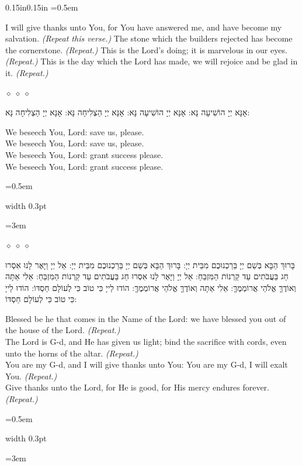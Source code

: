 \documentclass[11pt, openany]{book}
\newenvironment{englishblock}{%
  \par\vspace{2pt}
  \begin{adjustwidth}{0.15in}{0.15in}
  \setstretch{1.4}
  \emergencystretch=0.5em
  \normalsize
}{%
  \end{adjustwidth}
  \par\vspace{3pt}
}
\newcommand{\sederdivider}{%
  \par\vspace{6pt}
  \begin{center}
    \textcolor{sedergold}{\pgfornament[width=1.5cm]{11}}
  \end{center}
  \par\vspace{6pt}
}
\newlength{\bidiHebWidth}
\newlength{\bidiEngWidth}
\newenvironment{bilingual}{%
  \par\vspace{4pt}%
}{%
  \noindent
  \begin{minipage}[t]{\bidiEngWidth}
    \setstretch{1.4}\emergencystretch=0.5em\normalsize
    \usebox{\bidiEngBox}
  \end{minipage}%
  \hfill
  {\color{sedergold}\vrule width 0.3pt}%
  \hfill
  \begin{minipage}[t]{\bidiHebWidth}
    \begingroup\hebrewfont\TeXXeTstate=1\beginR
    \large\setstretch{1.4}\emergencystretch=3em\tolerance=9999\parindent=0pt\relax
    \usebox{\bidiHebBox}
    \endR\endgroup
  \end{minipage}%
  \par\vspace{2pt}%
}
\newenvironment{hebrewcol}{%
  \begin{lrbox}{\bidiHebBox}\begin{minipage}{\bidiHebWidth}%
}{%
  \end{minipage}\end{lrbox}%
}
\newenvironment{englishcol}{%
  \begin{lrbox}{\bidiEngBox}\begin{minipage}{\bidiEngWidth}%
}{%
  \end{minipage}\end{lrbox}%
}
\newcommand{\parasep}{%
  \par\vspace{3pt}
  \begin{center}
    \textcolor{sedergold!50}{\tiny$\diamond\;\diamond\;\diamond$}
  \end{center}
  \par\vspace{3pt}
}
\begin{document}
\begin{englishblock}
I will give thanks unto You, for You have answered me, and have become my salvation. \textit{(Repeat this verse.)} The stone which the builders rejected has become the cornerstone. \textit{(Repeat.)} This is the Lord’s doing; it is marvelous in our eyes. \textit{(Repeat.)} This is the day which the Lord has made, we will rejoice and be glad in it. \textit{(Repeat.)}
\end{englishblock}
\parasep

\begin{bilingual}
\begin{hebrewcol}
אָנָּא יְיָ הוֹשִׁיעָה נָּא:
אָנָּא יְיָ הוֹשִׁיעָה נָּא:
אָנָּא יְיָ הַצְלִיחָה נָּא:
אָנָּא יְיָ הַצְלִיחָה נָּא:
\end{hebrewcol}
\begin{englishcol}
We beseech You, Lord: save us, please.\\[2pt]
We beseech You, Lord: save us, please.\\[2pt]
We beseech You, Lord: grant success please.\\[2pt]
We beseech You, Lord: grant success please.
\end{englishcol}
\end{bilingual}
\parasep

\begin{bilingual}
\begin{hebrewcol}
בָּרוּךְ הַבָּא בְּשֵׁם יְיָ בֵּרַכְנוּכֶם מִבֵּית יְיָ:
בָּרוּךְ הַבָּא בְּשֵׁם יְיָ בֵּרַכְנוּכֶם מִבֵּית יְיָ: אֵל יְיָ וַיָּאֶר לָנוּ אִסְרוּ חַג בַּעֲבֹתִים עַד קַרְנוֹת הַמִּזְבֵּחַ: אֵל יְיָ וַיָּאֶר לָנוּ אִסְרוּ חַג בַּעֲבֹתִים עַד קַרְנוֹת הַמִּזְבֵּחַ: אֵלִי אַתָּה וְאוֹדֶךָּ אֱלֹהַי אֲרוֹמְמֶךָּ: אֵלִי אַתָּה וְאוֹדֶךָּ אֱלֹהַי אֲרוֹמְמֶךָּ: הוֹדוּ לַייָ כִּי טוֹב כִּי לְעוֹלָם חַסְדּוֹ: הוֹדוּ לַייָ כִּי טוֹב כִּי לְעוֹלָם חַסְדּוֹ:
\end{hebrewcol}
\begin{englishcol}
Blessed be he that comes in the Name of the Lord: we have blessed you out of the house of the Lord. \textit{(Repeat.)}\\[2pt]
The Lord is G-d, and He has given us light; bind the sacrifice with cords, even unto the horns of the altar. \textit{(Repeat.)}\\[2pt]
You are my G-d, and I will give thanks unto You: You are my G-d, I will exalt You. \textit{(Repeat.)}\\[2pt]
Give thanks unto the Lord, for He is good, for His mercy endures forever. \textit{(Repeat.)}
\end{englishcol}
\end{bilingual}
\sederdivider
\end{document}

